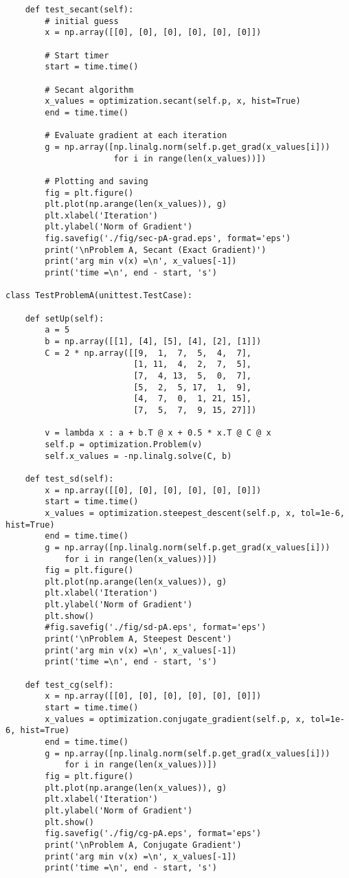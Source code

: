 \begin{lstlisting}
    def test_secant(self):
        # initial guess
        x = np.array([[0], [0], [0], [0], [0], [0]])

        # Start timer
        start = time.time()

        # Secant algorithm
        x_values = optimization.secant(self.p, x, hist=True)
        end = time.time()

        # Evaluate gradient at each iteration
        g = np.array([np.linalg.norm(self.p.get_grad(x_values[i]))
                      for i in range(len(x_values))])

        # Plotting and saving
        fig = plt.figure()
        plt.plot(np.arange(len(x_values)), g)
        plt.xlabel('Iteration')
        plt.ylabel('Norm of Gradient')
        fig.savefig('./fig/sec-pA-grad.eps', format='eps')
        print('\nProblem A, Secant (Exact Gradient)')
        print('arg min v(x) =\n', x_values[-1])
        print('time =\n', end - start, 's')

class TestProblemA(unittest.TestCase):

    def setUp(self):
        a = 5
        b = np.array([[1], [4], [5], [4], [2], [1]])
        C = 2 * np.array([[9,  1,  7,  5,  4,  7],
                          [1, 11,  4,  2,  7,  5],
                          [7,  4, 13,  5,  0,  7],
                          [5,  2,  5, 17,  1,  9],
                          [4,  7,  0,  1, 21, 15],
                          [7,  5,  7,  9, 15, 27]])

        v = lambda x : a + b.T @ x + 0.5 * x.T @ C @ x
        self.p = optimization.Problem(v)
        self.x_values = -np.linalg.solve(C, b)

    def test_sd(self):
        x = np.array([[0], [0], [0], [0], [0], [0]])
        start = time.time()
        x_values = optimization.steepest_descent(self.p, x, tol=1e-6, hist=True)
        end = time.time()
        g = np.array([np.linalg.norm(self.p.get_grad(x_values[i]))
            for i in range(len(x_values))])
        fig = plt.figure()
        plt.plot(np.arange(len(x_values)), g)
        plt.xlabel('Iteration')
        plt.ylabel('Norm of Gradient')
        plt.show()
        #fig.savefig('./fig/sd-pA.eps', format='eps')
        print('\nProblem A, Steepest Descent')
        print('arg min v(x) =\n', x_values[-1])
        print('time =\n', end - start, 's')

    def test_cg(self):
        x = np.array([[0], [0], [0], [0], [0], [0]])
        start = time.time()
        x_values = optimization.conjugate_gradient(self.p, x, tol=1e-6, hist=True)
        end = time.time()
        g = np.array([np.linalg.norm(self.p.get_grad(x_values[i]))
            for i in range(len(x_values))])
        fig = plt.figure()
        plt.plot(np.arange(len(x_values)), g)
        plt.xlabel('Iteration')
        plt.ylabel('Norm of Gradient')
        plt.show()
        fig.savefig('./fig/cg-pA.eps', format='eps')
        print('\nProblem A, Conjugate Gradient')
        print('arg min v(x) =\n', x_values[-1])
        print('time =\n', end - start, 's')


\end{lstlisting}
